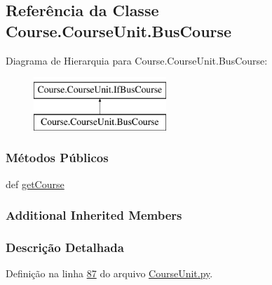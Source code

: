 \hypertarget{classCourse_1_1CourseUnit_1_1BusCourse}{\subsection{Referência da Classe Course.\-Course\-Unit.\-Bus\-Course}
\label{classCourse_1_1CourseUnit_1_1BusCourse}
}
Diagrama de Hierarquia para Course.\-Course\-Unit.\-Bus\-Course\-:\begin{figure}[H]
\begin{center}
\leavevmode
\includegraphics[height=2.000000cm]{d9/d88/classCourse_1_1CourseUnit_1_1BusCourse}
\end{center}
\end{figure}
\subsubsection*{Métodos Públicos}
\begin{DoxyCompactItemize}
\item 
def \hyperlink{classCourse_1_1CourseUnit_1_1BusCourse_ac7306e270597d7aac641d956f8e3f31f}{get\-Course}
\end{DoxyCompactItemize}
\subsubsection*{Additional Inherited Members}


\subsubsection{Descrição Detalhada}


Definição na linha \hyperlink{CourseUnit_8py_source_l00087}{87} do arquivo \hyperlink{CourseUnit_8py_source}{Course\-Unit.\-py}.



